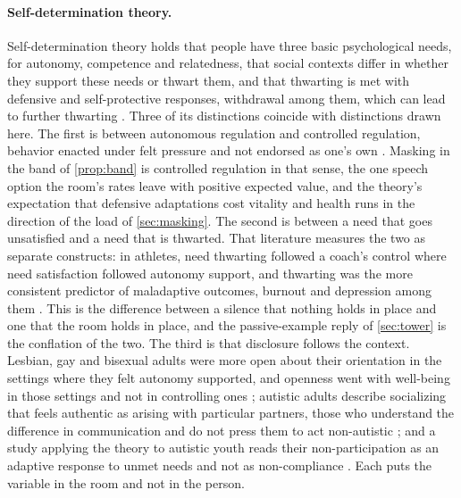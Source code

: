\paragraph{Self-determination theory.} Self-determination theory holds that people have three basic psychological needs, for autonomy, competence and relatedness, that social contexts differ in whether they support these needs or thwart them, and that thwarting is met with defensive and self-protective responses, withdrawal among them, which can lead to further thwarting \cite{DeciRyan2000}. Three of its distinctions coincide with distinctions drawn here. The first is between autonomous regulation and controlled regulation, behavior enacted under felt pressure and not endorsed as one's own \cite{DeciRyan2000}. Masking in the band of \autoref{prop:band} is controlled regulation in that sense, the one speech option the room's rates leave with positive expected value, and the theory's expectation that defensive adaptations cost vitality and health runs in the direction of the load of \autoref{sec:masking}. The second is between a need that goes unsatisfied and a need that is thwarted. That literature measures the two as separate constructs: in athletes, need thwarting followed a coach's control where need satisfaction followed autonomy support, and thwarting was the more consistent predictor of maladaptive outcomes, burnout and depression among them \cite{Bartholomew2011}. This is the difference between a silence that nothing holds in place and one that the room holds in place, and the passive-example reply of \autoref{sec:tower} is the conflation of the two. The third is that disclosure follows the context. Lesbian, gay and bisexual adults were more open about their orientation in the settings where they felt autonomy supported, and openness went with well-being in those settings and not in controlling ones \cite{Legate2012}; autistic adults describe socializing that feels authentic as arising with particular partners, those who understand the difference in communication and do not press them to act non-autistic \cite{Cook2023}; and a study applying the theory to autistic youth reads their non-participation as an adaptive response to unmet needs and not as non-compliance \cite{Wong2026}. Each puts the variable in the room and not in the person.

